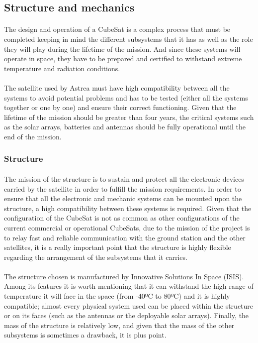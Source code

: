 \subsection{Structure and mechanics}

\paragraph{}The design and operation of a CubeSat is a complex process that must be completed keeping in mind the different subsystems that it has as well as the role they will play during the lifetime of the mission. And since these systems will operate in space, they have to be prepared and certified to withstand extreme temperature and radiation conditions.

\paragraph{}The satellite used by Astrea must have high compatibility between all the systems to avoid potential problems and has to be tested (either all the systems together or one by one) and ensure their correct functioning. Given that the lifetime of the mission should be greater than four years, the critical systems such as the solar arrays, batteries and antennas should be fully operational until the end of the mission.

\subsubsection{Structure}

\paragraph{}The mission of the structure is to sustain and protect all the electronic devices carried by the satellite in order to fulfill the mission requirements. In order to ensure that all the electronic and mechanic systems can be mounted upon the structure, a high compatibility between these systems is required. Given that the configuration of the CubeSat is not as common as other configurations of the current commercial or operational CubeSats, due to the mission of the project is to relay fast and reliable communication with the ground station and the other satellites, it is a really important point that the structure is highly flexible regarding the arrangement of the subsystems that it carries.

\paragraph{}The structure chosen is manufactured by Innovative Solutions In Space (ISIS). Among its features it is worth mentioning that it can withstand the high range of temperature it will face in the space (from -40ºC to 80ºC) and it is highly compatible; almost every physical system  used can be placed within the structure or on its faces (such as the antennas or the deployable solar arrays). Finally, the mass of the structure is relatively low, and given that the mass of the other subsystems is sometimes a drawback, it is plus point.

